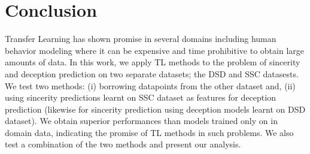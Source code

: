 \documentclass{article}
\begin{document}
%

\section{Conclusion}

Transfer Learning has shown promise in several domains including human behavior modeling where it can be expensive and time prohibitive to obtain large amounts of data.
In this work, we apply TL methods to the problem of sincerity and deception prediction on two separate datasets; the DSD and SSC datasests. 
We test two methods: (i) borrowing datapoints from the other dataset and, (ii) using sincerity predictions learnt on SSC dataset as features for deception prediction (likewise for sincerity prediction using deception models learnt on DSD dataset). 
We obtain superior performances than models trained only on in domain data, indicating the promise of TL methods in such problems. 
We also test a combination of the two methods and present our analysis.
\end{document}
